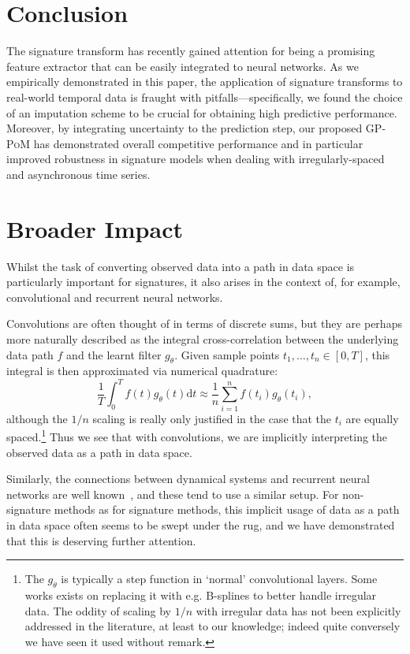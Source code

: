 \documentclass{article}
\begin{document}
\section{Conclusion}

The signature transform has recently gained attention for being
a promising feature extractor that can be easily integrated to neural
networks. As we empirically demonstrated in this paper, the application
of signature transforms to real-world temporal data is fraught with
pitfalls---specifically, we found the choice of an imputation scheme to
be crucial for obtaining high predictive performance. Moreover, by
integrating uncertainty to the prediction step, our proposed
\textsc{GP-PoM} has demonstrated overall competitive performance and in
particular improved robustness in signature models when dealing with
irregularly-spaced and asynchronous time series. 

\section*{Broader Impact}

Whilst the task of converting observed data into a path in data space is particularly important for signatures, it also arises in the context of, for example, convolutional and recurrent neural networks.

Convolutions are often thought of in terms of discrete sums, but they are perhaps more naturally described as the integral cross-correlation between the underlying data path $f$ and the learnt filter $g_\theta$. Given sample points $t_1, \ldots, t_n \in [0, T]$, this integral is then approximated via numerical quadrature:
\begin{equation*}
    \frac{1}{T}\int_0^T f(t) g_\theta(t) \mathrm{d}t \approx \frac{1}{n}\sum_{i = 1}^n f(t_i) g_\theta(t_i),
\end{equation*}
although the $1/n$ scaling is really only justified in the case that the $t_i$ are equally spaced.\footnote{The $g_\theta$ is typically a step function in `normal' convolutional layers. Some works exists on replacing it with e.g. B-splines \cite{fey2018splinecnn} to better handle irregular data. The oddity of scaling by $1/n$ with irregular data has not been explicitly addressed in the literature, at least to our knowledge; indeed quite conversely we have seen it used without remark.} Thus we see that with convolutions, we are implicitly interpreting the observed data as a path in data space.

Similarly, the connections between dynamical systems and recurrent neural
networks are well known~\citep{FUNAHASHI1993801, continuousrnn}, and these tend to use a similar setup.
%
For non-signature methods as for signature methods, this implicit usage of data as a path in data space often seems to be swept under the rug, and we have demonstrated that this is deserving further attention.
\end{document}
